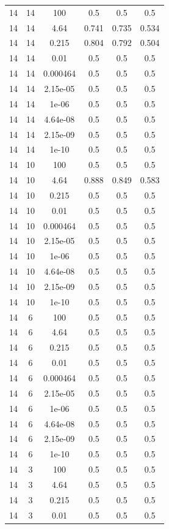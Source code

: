 \begin{table}[ht]
\begin{tabular}{ |c|c|c|c|c|c| }
14 & 14 & 100 & 0.5 & 0.5 & 0.5 \\
14 & 14 & 4.64 & 0.741 & 0.735 & 0.534 \\
14 & 14 & 0.215 & 0.804 & 0.792 & 0.504 \\
14 & 14 & 0.01 & 0.5 & 0.5 & 0.5 \\
14 & 14 & 0.000464 & 0.5 & 0.5 & 0.5 \\
14 & 14 & 2.15e-05 & 0.5 & 0.5 & 0.5 \\
14 & 14 & 1e-06 & 0.5 & 0.5 & 0.5 \\
14 & 14 & 4.64e-08 & 0.5 & 0.5 & 0.5 \\
14 & 14 & 2.15e-09 & 0.5 & 0.5 & 0.5 \\
14 & 14 & 1e-10 & 0.5 & 0.5 & 0.5 \\
14 & 10 & 100 & 0.5 & 0.5 & 0.5 \\
14 & 10 & 4.64 & 0.888 & 0.849 & 0.583 \\
14 & 10 & 0.215 & 0.5 & 0.5 & 0.5 \\
14 & 10 & 0.01 & 0.5 & 0.5 & 0.5 \\
14 & 10 & 0.000464 & 0.5 & 0.5 & 0.5 \\
14 & 10 & 2.15e-05 & 0.5 & 0.5 & 0.5 \\
14 & 10 & 1e-06 & 0.5 & 0.5 & 0.5 \\
14 & 10 & 4.64e-08 & 0.5 & 0.5 & 0.5 \\
14 & 10 & 2.15e-09 & 0.5 & 0.5 & 0.5 \\
14 & 10 & 1e-10 & 0.5 & 0.5 & 0.5 \\
14 & 6 & 100 & 0.5 & 0.5 & 0.5 \\
14 & 6 & 4.64 & 0.5 & 0.5 & 0.5 \\
14 & 6 & 0.215 & 0.5 & 0.5 & 0.5 \\
14 & 6 & 0.01 & 0.5 & 0.5 & 0.5 \\
14 & 6 & 0.000464 & 0.5 & 0.5 & 0.5 \\
14 & 6 & 2.15e-05 & 0.5 & 0.5 & 0.5 \\
14 & 6 & 1e-06 & 0.5 & 0.5 & 0.5 \\
14 & 6 & 4.64e-08 & 0.5 & 0.5 & 0.5 \\
14 & 6 & 2.15e-09 & 0.5 & 0.5 & 0.5 \\
14 & 6 & 1e-10 & 0.5 & 0.5 & 0.5 \\
14 & 3 & 100 & 0.5 & 0.5 & 0.5 \\
14 & 3 & 4.64 & 0.5 & 0.5 & 0.5 \\
14 & 3 & 0.215 & 0.5 & 0.5 & 0.5 \\
14 & 3 & 0.01 & 0.5 & 0.5 & 0.5 \\

\end{tabular}
\end{table}
